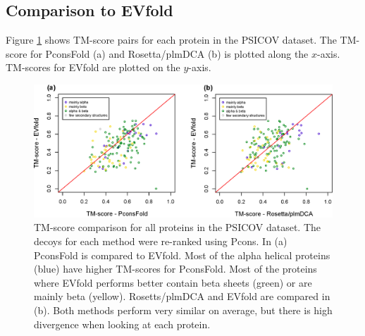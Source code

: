 \documentclass{bioinfo}
\begin{document}
\subsection{Comparison to EVfold}
Figure \ref{fig:vs} shows TM-score pairs for each protein in the PSICOV dataset. The TM-score for PconsFold (a) and Rosetta/plmDCA (b) is plotted along the $x$-axis. TM-scores for EVfold are plotted on the $y$-axis. 
\begin{figure}[!tpb]%
\centerline{\includegraphics[scale=0.7]{figures/vs.eps}}
\caption{TM-score comparison for all proteins in the PSICOV dataset. The decoys for each method were re-ranked using Pcons. In (a) PconsFold is compared to EVfold. Most of the alpha helical proteins (blue) have higher TM-scores for PconsFold. Most of the proteins where EVfold performs better contain beta sheets (green) or are mainly beta (yellow). Rosetts/plmDCA and EVfold are compared in (b). Both methods perform very similar on average, but there is high divergence when looking at each protein.}\label{fig:vs}
\end{figure}
\end{document}
